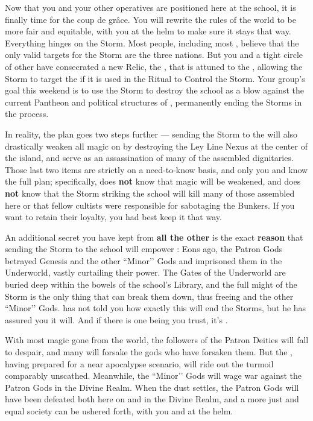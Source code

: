 \documentclass[char]{GL2020}
\begin{document}
Now that you and your other operatives are positioned here at the school, it is finally time for the coup de grâce. You will rewrite the rules of the world to be more fair and equitable, with you at the helm to make sure it stays that way. Everything hinges on the Storm. Most people, including most \pGoaties{}, believe that the only valid targets for the Storm are the three nations. But you and a tight circle of other \pGoaties{} have consecrated a new Relic, the \iHorseshoe{}, that is attuned to the \pSchool{}, allowing the Storm to target the \pSc{} if it is used in the Ritual to Control the Storm. Your group's goal this weekend is to use the Storm to destroy the school as a blow against the current Pantheon and political structures of \pEarth{}, permanently ending the Storms in the process. 

In reality, the plan goes two steps further — sending the Storm to the \pSc{} will also drastically weaken all magic on \pEarth{} by destroying the Ley Line Nexus at the center of the island, and serve as an assassination of many of the assembled dignitaries. Those last two items are strictly on a need-to-know basis, and only you and \cChupSecond{} know the full plan; specifically, \cChupInventor{} does \textbf{not} know that magic will be weakened, and \cChupStudent{} does \textbf{not} know that the Storm striking the school will kill many of those assembled here or that \cChupStudent{\their} fellow cultists were responsible for sabotaging the Bunkers. If you want to retain their loyalty, you had best keep it that way. 

An additional secret you have kept from \textbf{all the other} \pGoaties{} is the exact \textbf{reason} that sending the Storm to the school will empower \cGenesis{}: Eons ago, the Patron Gods betrayed Genesis and the other ``Minor’’ Gods and imprisoned them in the Underworld, vastly curtailing their power. The Gates of the Underworld are buried deep within the bowels of the school’s Library, and the full might of the Storm is the only thing that can break them down, thus freeing \cGenesis{} and the other ``Minor’’ Gods. \cGenesis{} has not told you how exactly this will end the Storms, but he has assured you it will. And if there is one being you trust, it's \cGenesis{}.

With most magic gone from the world, the followers of the Patron Deities will fall to despair, and many will forsake the gods who have forsaken them. But the \pGoaties{}, having prepared for a near apocalypse scenario, will ride out the turmoil comparably unscathed. Meanwhile, the ``Minor’’ Gods will wage war against the Patron Gods in the Divine Realm. When the dust settles, the Patron Gods will have been defeated both here on \pEarth{} and in the Divine Realm, and a more just and equal society can be ushered forth, with you and \cGenesis{} at the helm.
\end{document}
